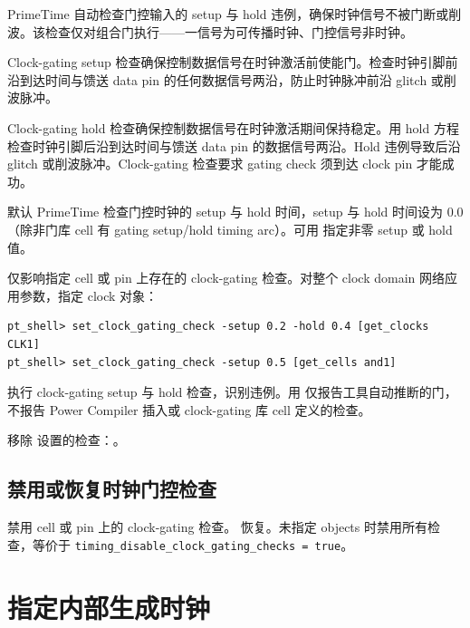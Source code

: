 PrimeTime 自动检查门控输入的 setup 与 hold 违例，确保时钟信号不被门断或削波。该检查仅对组合门执行——一信号为可传播时钟、门控信号非时钟。

Clock-gating setup 检查确保控制数据信号在时钟激活前使能门。检查时钟引脚前沿到达时间与馈送 data pin 的任何数据信号两沿，防止时钟脉冲前沿 glitch 或削波脉冲。


Clock-gating hold 检查确保控制数据信号在时钟激活期间保持稳定。用 hold 方程检查时钟引脚后沿到达时间与馈送 data pin 的数据信号两沿。Hold 违例导致后沿 glitch 或削波脉冲。Clock-gating 检查要求 gating check 须到达 clock pin 才能成功。


默认 PrimeTime 检查门控时钟的 setup 与 hold 时间，setup 与 hold 时间设为 0.0（除非门库 cell 有 gating setup/hold timing arc）。可用  指定非零 setup 或 hold 值。

 仅影响指定 cell 或 pin 上存在的 clock-gating 检查。对整个 clock domain 网络应用参数，指定 clock 对象：
\begin{lstlisting}
pt_shell> set_clock_gating_check -setup 0.2 -hold 0.4 [get_clocks CLK1]
pt_shell> set_clock_gating_check -setup 0.5 [get_cells and1]
\end{lstlisting}

 执行 clock-gating setup 与 hold 检查，识别违例。用  仅报告工具自动推断的门，不报告 Power Compiler 插入或 clock-gating 库 cell 定义的检查。

移除  设置的检查：。

\subsection{禁用或恢复时钟门控检查}
 禁用 cell 或 pin 上的 clock-gating 检查。 恢复。未指定 objects 时禁用所有检查，等价于 \texttt{timing\_disable\_clock\_gating\_checks = true}。

\section{指定内部生成时钟}
